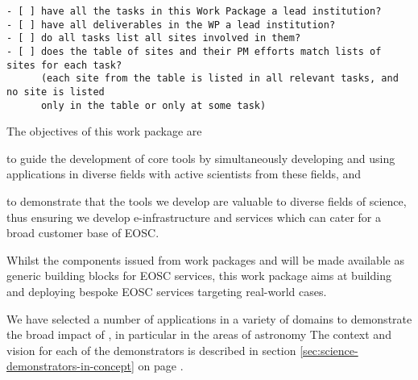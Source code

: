 \begin{draft}
\begin{verbatim}
- [ ] have all the tasks in this Work Package a lead institution?
- [ ] have all deliverables in the WP a lead institution?
- [ ] do all tasks list all sites involved in them?
- [ ] does the table of sites and their PM efforts match lists of sites for each task?
      (each site from the table is listed in all relevant tasks, and no site is listed
      only in the table or only at some task)
\end{verbatim}
\end{draft}

\begin{workpackage}[
  id=applications,
  wphases=0-36,
  swsites,
  title=Applications and use cases,
  short=Applications,
  lead=MP,
  SRLRM=9,
]
\begin{wpobjectives}
  The objectives of this work package are
 \begin{compactitem}
   \item to guide the development of core tools by simultaneously
     developing and using applications in diverse fields with active
     scientists from these fields, and
   \item to demonstrate that the tools we develop are valuable to diverse
     fields of science, thus ensuring we develop e-infrastructure and
     services which can cater for a broad customer base of EOSC.
   \end{compactitem}
\end{wpobjectives}

\begin{wpdescription}

  Whilst the components issued from work packages   and  will be
  made available as generic building blocks for EOSC services, this
  work package aims at building and deploying bespoke EOSC services
  targeting real-world cases.

  We have selected a number of applications in a variety of domains
  to demonstrate the broad impact of \TheProject, in particular in the
  areas of astronomy
  The context and vision for each of the demonstrators is described in
  section \ref{sec:science-demonstrators-in-concept} on page
  \pageref{sec:science-demonstrators-in-concept}.


\end{wpdescription}
\end{workpackage}
